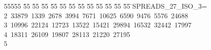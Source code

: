 %
%
\begin{tabbing}
55555 \= 55 \= 55 \= 55 \= 55 \= 55 \= 55 \= 55 \= 55 \= 55 \= 55 \= 55 \= 55 \= \>SPREADS\_27\_ISO\_3=\\[0pt]
2\ 33879\ 1339\ 2678\ 3994\ 7671\ 10625\ 6590\ 9476\ 5576\ 24688\ \\[0pt]
3\ 10996\ 22124\ 12723\ 13522\ 15421\ 29894\ 16532\ 32442\ 17997\ \\[0pt]
4\ 18311\ 26109\ 19807\ 28113\ 21220\ 27195\\[0pt]
5\>\end{tabbing}

